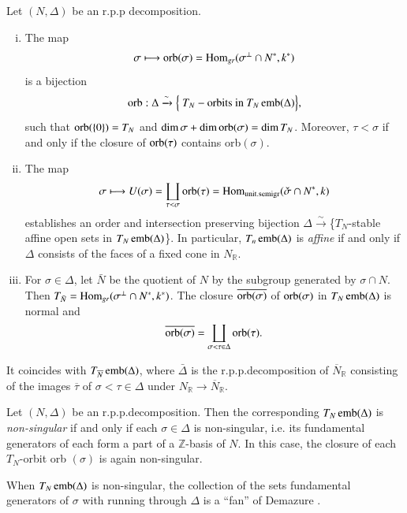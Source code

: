 \begin{theorem}\label{chap1:thm4.2} %
Let $(N, \Delta)$ be an r.p.p decomposition. 
\begin{enumerate}[(i)]
\item The map 
$$
\sigma \longmapsto \operatorname{orb} (\sigma) = \operatorname{Hom}_{gr} (\sigma^\perp \cap N^*, k^*)  
$$
is a bijection 
$$
\operatorname{orb} : \Delta \xrightarrow{ \sim} \Big\{\ T_N- \text{orbits in } T_N
\operatorname{emb} (\Delta)\Big\},  
$$
such that $\operatorname{orb} (\{0\})= T_N$ and $\dim \sigma + \dim \operatorname{orb} (\sigma) =
\dim T_N$. Moreover, $\tau < \sigma $ if and only if the closure of
$\operatorname{orb}(\tau)$ contains orb$(\sigma)$.  

\item The map
$$
\sigma \longmapsto U (\sigma) = \coprod_{\tau < \sigma} \operatorname{orb} (\tau) = 
\operatorname{Hom}_{\text{unit.semigr}} (\check{\sigma} \cap N^*, k ) 
$$
establishes an order and intersection preserving bijection $\Delta
\xrightarrow {\sim}$\pageoriginale \{$T_N$-stable affine open sets in
$T_N \operatorname{emb} (\Delta)$\}. In particular, $T_n \operatorname{emb} (\Delta)$ is
\textit{affine} if and only if $\Delta$ consists of the faces of a
fixed cone in $N_\mathbb{R}$.  

\item For $\sigma \in \Delta$, let $\bar{N}$ be the quotient of $N$ by
  the subgroup generated by $\sigma \cap N$. Then $T_{\bar{N}} =
  \operatorname{Hom}_{gr} (\sigma^\perp \cap N^\ast, k^\ast)$. The closure
  $\overline{\operatorname{orb}(\sigma)}$ of $\operatorname{orb}(\sigma)$  in $T_N \operatorname{emb}(\Delta)$
  is normal and 
$$
\overline{\operatorname{orb} (\sigma)} = \coprod\limits_{\sigma < \tau\in
    \Delta} \operatorname{orb} (\tau).  
$$
\end{enumerate}

It coincides with $T_{\overline{N}}\operatorname{emb} (\Delta)$, where $\bar{\Delta}$ is the
r.p.p.decomposition of $\overline{N}_{\mathbb{R}}$ consisting of the
images $\overline{\tau}$ of $\sigma < \tau \in \Delta$ under
$N_{\mathbb{R}} \to \overline{N}_{\mathbb{R}}$.  
\end{theorem}

\begin{theorem}\label{chap1:thm4.3} %
Let $(N,\Delta)$ be an r.p.p.decomposition. Then the corresponding
$T_N \operatorname{emb}(\Delta)$ is \textit{non-singular} if and only if each
$\sigma \in \Delta$ is non-singular, i.e. its fundamental generators
of each form a part of a $\mathbb{Z}$-basis of $N$. In this case, the
closure of each  $T_N$-orbit orb $(\sigma)$ is again non-singular.  
\end{theorem}

\begin{remark*}
When $T_N \operatorname{emb} (\Delta)$ is non-singular, the collection of the sets
fundamental generators of $\sigma$ with running through $\Delta$ is a
``fan'' of Demazure \cite[\S. \ref{chap1:sec4}, $n^\circ$.2]{keyD2}. 
\end{remark*}

